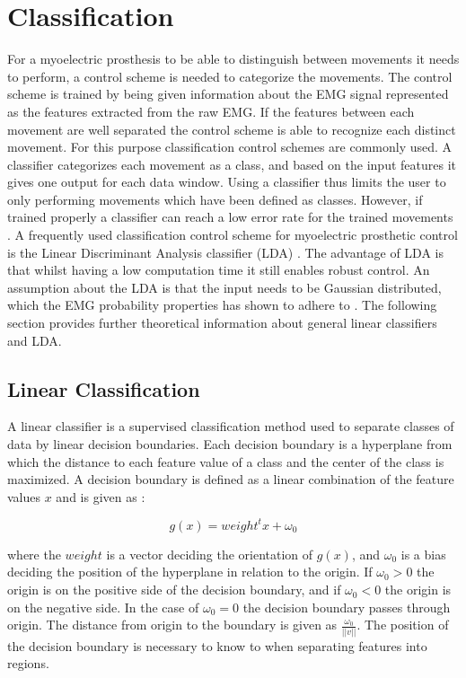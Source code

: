\section{Classification} \label{sec:BG:classification}
For a myoelectric prosthesis to be able to distinguish between movements it needs to perform, a control scheme is needed to categorize the movements. The control scheme is trained by being given information about the EMG signal represented as the features extracted from the raw EMG. If the features between each movement are well separated the control scheme is able to recognize each distinct movement. For this purpose classification control schemes are commonly used. A classifier categorizes each movement as a class, and based on the input features it gives one output for each data window. Using a classifier thus limits the user to only performing movements which have been defined as classes. However, if trained properly a classifier can reach a low error rate for the trained movements \cite{Scheme2013}. A frequently used classification control scheme for myoelectric prosthetic control is the Linear Discriminant Analysis classifier (LDA) \cite{Englehart2003, Scheme2015, Fang2017, Scheme2013}. The advantage of LDA is that whilst having a low computation time it still enables robust control. An assumption about the LDA is that the input needs to be Gaussian distributed, which the EMG probability properties has shown to adhere to \cite{Duda2000, Nazarpour2013}. The following section provides further theoretical information about general linear classifiers and LDA.


\subsection{Linear Classification} \label{sub:BG:linearClassification}
A linear classifier is a supervised classification method used to separate classes of data by linear decision boundaries. Each decision boundary is a hyperplane from which the distance to each feature value of a class and the center of the class is maximized. A decision boundary is defined as a linear combination of the feature values $x$ and is given as \cite{Duda2000}:

\begin{equation}
g(x) = weight^tx +\omega_0
\end{equation}

where the $weight$ is a vector deciding the orientation of $g(x)$, and $\omega_0$ is a bias deciding the position of the hyperplane in relation to the origin. If $\omega_0 > 0$ the origin is on the positive side of the decision boundary, and if $\omega_0 < 0$ the origin is on the negative side. In the case of $\omega_0 = 0$ the decision boundary passes through origin. The distance from origin to the boundary is given as $\frac{\omega_0}{||v||}$. The position of the decision boundary is necessary to know to when separating features into regions. \cite{Duda2000}

